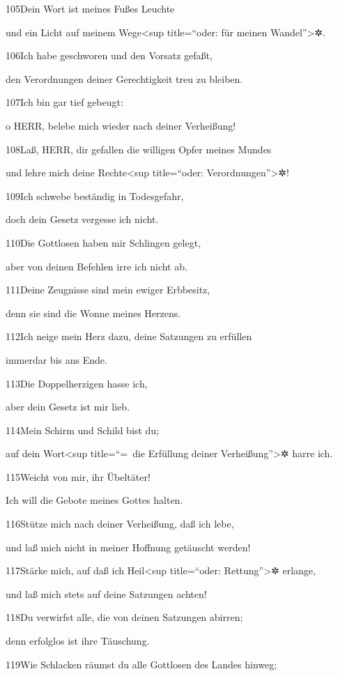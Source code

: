 105Dein Wort ist meines Fußes Leuchte

und ein Licht auf meinem Wege\textless sup title=``oder: für meinen
Wandel''\textgreater✲.

106Ich habe geschworen und den Vorsatz gefaßt,

den Verordnungen deiner Gerechtigkeit treu zu bleiben.

107Ich bin gar tief gebeugt:

o HERR, belebe mich wieder nach deiner Verheißung!

108Laß, HERR, dir gefallen die willigen Opfer meines Mundes

und lehre mich deine Rechte\textless sup title=``oder:
Verordnungen''\textgreater✲!

109Ich schwebe beständig in Todesgefahr,

doch dein Gesetz vergesse ich nicht.

110Die Gottlosen haben mir Schlingen gelegt,

aber von deinen Befehlen irre ich nicht ab.

111Deine Zeugnisse sind mein ewiger Erbbesitz,

denn sie sind die Wonne meines Herzens.

112Ich neige mein Herz dazu, deine Satzungen zu erfüllen

immerdar bis ans Ende.

113Die Doppelherzigen hasse ich,

aber dein Gesetz ist mir lieb.

114Mein Schirm und Schild bist du;

auf dein Wort\textless sup title=``=~die Erfüllung deiner
Verheißung''\textgreater✲ harre ich.

115Weicht von mir, ihr Übeltäter!

Ich will die Gebote meines Gottes halten.

116Stütze mich nach deiner Verheißung, daß ich lebe,

und laß mich nicht in meiner Hoffnung getäuscht werden!

117Stärke mich, auf daß ich Heil\textless sup title=``oder:
Rettung''\textgreater✲ erlange,

und laß mich stets auf deine Satzungen achten!

118Du verwirfst alle, die von deinen Satzungen abirren;

denn erfolglos ist ihre Täuschung.

119Wie Schlacken räumst du alle Gottlosen des Landes hinweg;

